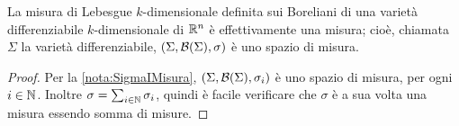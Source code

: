 \begin{theorem}
	La misura di Lebesgue $k$-dimensionale definita sui Boreliani di una varietà differenziabile $k$-dimensionale di $\mathbb R^n$ è effettivamente una misura; cioè, chiamata $\Sigma$ la varietà differenziabile, $(\Sigma,\mathcal B(\Sigma),\sigma)$ è uno spazio di misura.
\end{theorem}
\begin{proof}
	Per la \cref{nota:SigmaIMisura}, $(\Sigma,\mathcal B(\Sigma),\sigma_i)$ è uno spazio di misura, per ogni $i\in\mathbb N$. Inoltre $\sigma=\sum_{i\in\mathbb N}\sigma_i$, quindi è facile verificare che $\sigma$ è a sua volta una misura essendo somma di misure.
\end{proof}